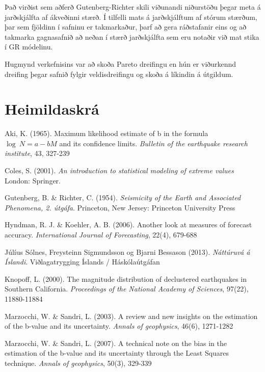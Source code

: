 \documentclass[10pt,a4paper,titlepage,twoside]{article}
\begin{document}
Það virðist sem aðferð Gutenberg-Richter skili viðunandi niðurstöðu þegar meta á jarðskjálfta af ákveðinni stærð. Í tilfelli mats á jarðskjálftum af stórum stærðum, þar sem fjöldinn í safninu er takmarkaður, þarf að gera ráðstafanir eins og að takmarka gagnasafnið að neðan í stærð jarðskjálfta sem eru notaðir við mat stika í GR módelinu.

Hugmynd verkefnisins var að skoða Pareto dreifingu en hún er viðurkennd dreifing þegar safnið fylgir veldisdreifingu og skoða á líkindin á útgildum.




\clearpage
\section{Heimildaskrá}

Aki, K. (1965). Maximum likelihood estimate of b in the formula $\log~N=a-bM$ and its confidence limits. \textit{Bulletin of the earthquake research institute}, 43, 327-239

Coles, S. (2001). \textit{An introduction to statistical modeling of extreme values} London: Springer.

Gutenberg, B. \& Richter, C. (1954). \textit{Seismicity of the Earth and Associated Phenomena, 2. útgáfa}. Princeton, New Jersey: Princeton University Press

Hyndman, R. J. \& Koehler, A. B. (2006). Another look at measures of forecast accuracy. \textit{International Journal of Forecasting}, 22(4), 679-688

Júlíus Sólnes, Freysteinn Sigmundsson og Bjarni Bessason (2013). \textit{Náttúruvá á Íslandi}. Viðlagatrygging Íslands / Háskólaútgáfan

Knopoff, L. (2000). The magnitude distribution of declustered earthquakes in Southern California. \textit{Proceedings of the National Academy of Sciences}, 97(22), 11880-11884

Marzocchi, W. \& Sandri, L. (2003). A review and new insights on the estimation of the b-value and its uncertainty. \textit{Annals of geophysics}, 46(6), 1271-1282

Marzocchi, W. \& Sandri, L. (2007). A technical note on the bias in the estimation of the b-value and its uncertainty through the Least Squares technique. \textit{Annals of geophysics}, 50(3), 329-339
\end{document}
